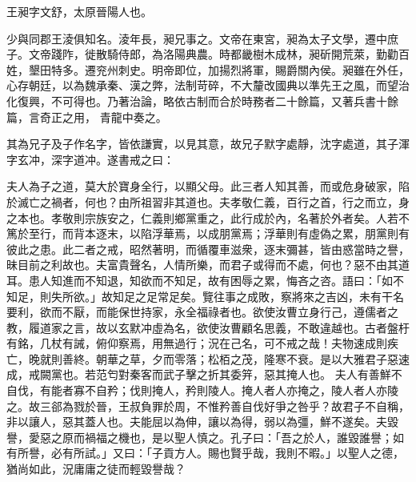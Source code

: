 \begin{pinyinscope}
 
 
 王昶字文舒，太原晉陽人也。
 
 
 少與同郡王淩俱知名。淩年長，昶兄事之。文帝在東宮，昶為太子文學，遷中庶子。文帝踐阼，徙散騎侍郎，為洛陽典農。時都畿樹木成林，昶斫開荒萊，勤勸百姓，墾田特多。遷兖州刺史。明帝即位，加揚烈將軍，賜爵關內侯。昶雖在外任，心存朝廷，以為魏承秦、漢之弊，法制苛碎，不大釐改國典以準先王之風，而望治化復興，不可得也。乃著治論，略依古制而合於時務者二十餘篇，又著兵書十餘篇，言奇正之用，
 青龍中奏之。
 
 
 
 
 其為兄子及子作名字，皆依謙實，以見其意，故兄子默字處靜，沈字處道，其子渾字玄冲，深字道冲。遂書戒之曰：
 
 
夫人為子之道，莫大於寶身全行，以顯父母。此三者人知其善，而或危身破家，陷於滅亡之禍者，何也？由所祖習非其道也。夫孝敬仁義，百行之首，行之而立，身之本也。孝敬則宗族安之，仁義則鄉黨重之，此行成於內，名著於外者矣。人若不篤於至行，而背本逐末，以陷浮華焉，以成朋黨焉；浮華則有虛偽之累，朋黨則有彼此之患。此二者之戒，昭然著明，而循覆車滋衆，逐末彌甚，皆由惑當時之譽，昧目前之利故也。夫富貴聲名，人情所樂，而君子或得而不處，何也？惡不由其道耳。患人知進而不知退，知欲而不知足，故有困辱之累，悔吝之咨。語曰：「如不知足，則失所欲。」故知足之足常足矣。覽往事之成敗，察將來之吉凶，未有干名要利，欲而不厭，而能保世持家，永全福祿者也。欲使汝曹立身行己，遵儒者之教，履道家之言，故以玄默冲虛為名，欲使汝曹顧名思義，不敢違越也。古者盤杅有銘，几杖有誡，俯仰察焉，用無過行；況在己名，可不戒之哉！夫物速成則疾亡，晚就則善終。朝華之草，夕而零落；松栢之茂，隆寒不衰。是以大雅君子惡速成，戒闕黨也。若范匄對秦客而武子擊之折其委笄，惡其掩人也。
 夫人有善鮮不自伐，有能者寡不自矜；伐則掩人，矜則陵人。掩人者人亦掩之，陵人者人亦陵之。故三郤為戮於晉，王叔負罪於周，不惟矜善自伐好爭之咎乎？故君子不自稱，非以讓人，惡其蓋人也。夫能屈以為伸，讓以為得，弱以為彊，鮮不遂矣。夫毀譽，愛惡之原而禍福之機也，是以聖人慎之。孔子曰：「吾之於人，誰毀誰譽；如有所譽，必有所試。」又曰：「子貢方人。賜也賢乎哉，我則不暇。」以聖人之德，猶尚如此，況庸庸之徒而輕毀譽哉？
 

\end{pinyinscope}
